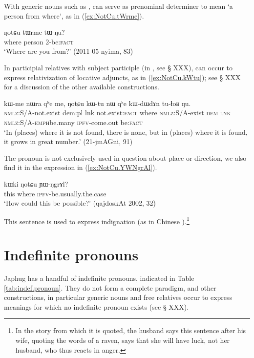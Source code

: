 With generic nouns such as ,  can serve as prenominal determiner to mean `a person from where', as in (\ref{ex:NotCu.tWrme}).

\begin{exe}
\ex \label{ex:NotCu.tWrme}
\gll ŋotɕu tɯrme tɯ-ŋu? \\
where person 2-be:\textsc{fact} \\
\glt `Where are you from?' (2011-05-nyima, 83)
\end{exe} 

In participial relatives with subject participle (in , see § XXX),  can occur to express relativization of locative adjuncts, as in  (\ref{ex:NotCu.kWtu}); see § XXX for a discussion of the other available constructions.

\begin{exe}
\ex \label{ex:NotCu.kWtu}
\gll kɯ-me nɯra qʰe me,  ŋotɕu kɯ-tu nɯ qʰe kɯ-dɯ\redp{}dɤn tu-ɬoʁ ŋu. \\
\textsc{nmlz}:S/A-not.exist dem:pl lnk not.exist:\textsc{fact} where \textsc{nmlz}:S/A-exist \textsc{dem} \textsc{lnk} \textsc{nmlz}:S/A-\textsc{emph}\redp{}be.many \textsc{ipfv}-come.out be:\textsc{fact} \\
\glt `In (places) where it is not found, there is none, but in (places) where it is found, it grows in great number.' (21-jmAGni, 91)
\end{exe} 

The pronoun  is not exclusively used in question about place or direction, we also find it in the expression in (\ref{ex:NotCu.YWNgrAl}).

 \begin{exe}
\ex \label{ex:NotCu.YWNgrAl}
\gll     kɯki 	ŋotɕu 	ɲɯ-ŋgrɤl?   \\
 this where \textsc{ipfv}-be.usually.the.case \\
\glt `How could this be possible?'  (qajdoskAt 2002, 32)
\end{exe} 

This sentence is used to express indignation (as in Chinese ).\footnote{In the story from which it is quoted, the husband says this sentence after his wife, quoting the words of a raven, says that she will have luck, not her husband, who thus reacts in anger. }



\section{Indefinite pronouns} \label{sec:indef.pro}
 Japhug has a handful of indefinite pronouns, indicated in Table \ref{tab:indef.pronoun}. They do not form a complete paradigm, and other constructions, in particular generic nouns and free relatives occur to express meanings for which no indefinite pronoun exists (see § XXX).

